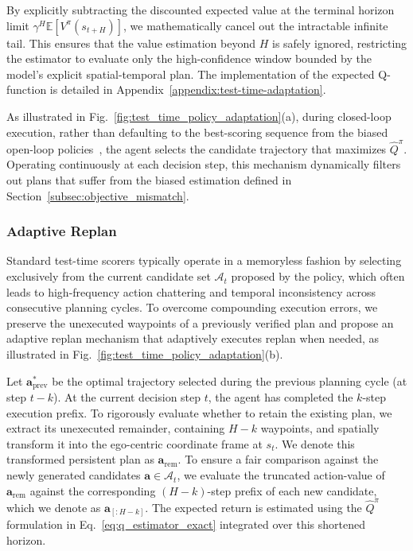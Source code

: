 \documentclass{article}
\begin{document}
By explicitly subtracting the discounted expected value at the terminal horizon limit $\gamma^H \mathbb{E} [ V^\pi(s_{t+H}) ]$, we mathematically cancel out the intractable infinite tail. This ensures that the value estimation beyond $H$ is safely ignored, restricting the estimator to evaluate only the high-confidence window bounded by the model's explicit spatial-temporal plan. The implementation of the expected Q-function is detailed in Appendix~\ref{appendix:test-time-adaptation}.

As illustrated in Fig.~\ref{fig:test_time_policy_adaptation}(a), during closed-loop execution, rather than defaulting to the best-scoring sequence from the biased open-loop policies~\cite{diffusiondrivev2, diffusiondrive}, the agent selects the candidate trajectory that maximizes $\hat{Q}^{\pi}$. Operating continuously at each decision step, this mechanism dynamically filters out plans that suffer from the biased estimation defined in Section~\ref{subsec:objective_mismatch}.

\subsubsection{Adaptive Replan}
\label{subsubsec:adaptive_replan}

Standard test-time scorers typically operate in a memoryless fashion by selecting exclusively from the current candidate set $\mathcal{A}_t$ proposed by the policy, which often leads to high-frequency action chattering and temporal inconsistency across consecutive planning cycles. To overcome compounding execution errors, we preserve the unexecuted waypoints of a previously verified plan and propose an adaptive replan mechanism that adaptively executes replan when needed, as illustrated in Fig.~\ref{fig:test_time_policy_adaptation}(b).

Let $\mathbf{a}^*_{\mathrm{prev}}$ be the optimal trajectory selected during the previous planning cycle (at step $t-k$). At the current decision step $t$, the agent has completed the $k$-step execution prefix. To rigorously evaluate whether to retain the existing plan, we extract its unexecuted remainder, containing $H-k$ waypoints, and spatially transform it into the ego-centric coordinate frame at $s_t$. We denote this transformed persistent plan as $\mathbf{a}_{\mathrm{rem}}$. To ensure a fair comparison against the newly generated candidates $\mathbf{a} \in \mathcal{A}_t$, we evaluate the truncated action-value of $\mathbf{a}_{\mathrm{rem}}$ against the corresponding $(H-k)$-step prefix of each new candidate, which we denote as $\mathbf{a}_{[:H-k]}$. The expected return is estimated using the $\hat{Q}^{\pi}$ formulation in Eq.~\ref{eq:q_estimator_exact} integrated over this shortened horizon.
\end{document}

